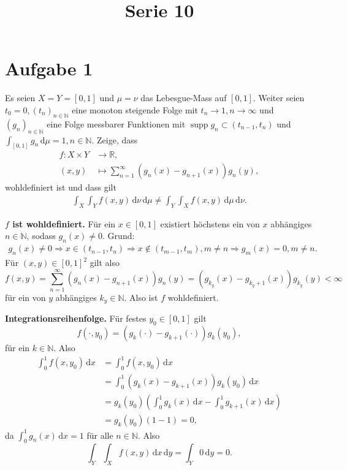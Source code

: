 \documentclass[10pt]{article}\usepackage[]{graphicx}\usepackage[]{color}
\title{Serie 10}
\date{}
\author{}
\newcommand{\N}{\mathbb{N}}
\newcommand{\R}{\mathbb{R}}
\newcommand{\df}{\,\textrm{d}}
\DeclareMathOperator*{\supp}{supp}
\begin{document}
\maketitle

\section*{Aufgabe 1}
Es seien $X = Y = [0,1]$ und
$\mu = \nu$ das Lebesgue-Mass auf $[0,1]$.
Weiter seien $t_0 = 0, (t_n)_{n \in \N}$
eine monoton steigende Folge mit $t_n \to 1, n \to \infty$
und $(g_n)_{n \in \N}$ eine Folge messbarer Funktionen
mit $\supp g_n \subset (t_{n-1}, t_n)$
und $\int_{[0,1]} g_n \df \mu = 1, n \in \N$.
Zeige, dass
\begin{align*}
  f: X \times Y     &\to    \R,\\
  (x,y) &\mapsto \sum_{n=1}^{\infty}(g_n(x)-g_{n+1}(x))g_n(y),
\end{align*}
wohldefiniert ist und dass gilt
\begin{align*}
  \int_X \int_Y f(x,y) \df \nu \df \mu \neq \int_Y \int_X f(x,y) \df \mu \df \nu.
\end{align*}

\textbf{$f$ ist wohldefiniert.}
Für ein $x \in [0,1]$ existiert höchstens ein von $x$ abhängiges $n \in \N$,
sodass $g_n(x) \neq 0$.
Grund:
\begin{align*}
g_n(x) \neq 0 \Rightarrow x \in (t_{n-1}, t_n) \Rightarrow x \notin (t_{m-1}, t_m), m \neq n \Rightarrow g_m(x) = 0, m \neq n. 
\end{align*}
Für $(x,y) \in [0,1]^2$ gilt also
\[
  f(x,y) = \sum_{n=1}^{\infty}(g_n(x)-g_{n+1}(x))g_n(y) = (g_{k_y}(x) - g_{k_y+1}(x))g_{k_y}(y) < \infty
\]
für ein von $y$ abhängiges $k_y \in \N$. Also ist $f$ wohldefiniert.

\textbf{Integrationsreihenfolge.}
Für festes $y_0 \in [0,1]$ gilt
\[
  f(\cdot,y_0) = (g_{k}(\cdot) - g_{k+1}(\cdot))g_{k}(y_0),
\]
für ein $k \in \N$.
Also 
\begin{align*}
  \int_0^1 f(x, y_0) \df x
  &= \int_0^1 f(x, y_0) \df x \\
  &= \int_0^1 (g_{k}(x) - g_{k+1}(x))g_{k}(y_0) \df x \\
  &= g_k(y_0)\left(\int_0^1 g_k(x) \df x - \int_0^1 g_{k+1}(x) \df x \right) \\
  &= g_k(y_0)\left(1 - 1\right) = 0,
\end{align*}
da $\int_0^1 g_n(x) \df x = 1$ für alle $n \in \N$.
Also 
\[
  \int_Y \int_X f(x,y) \df x \df y = \int_Y 0 \df y = 0.
\]
\end{document}
